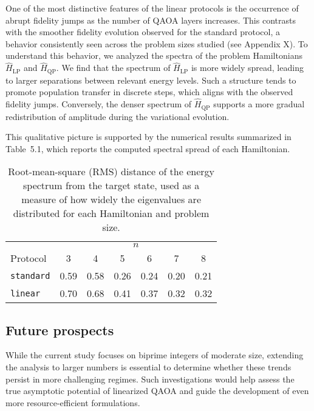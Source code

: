 One of the most distinctive features of the linear protocols is the occurrence of abrupt fidelity jumps as the number of QAOA layers increases.  
This contrasts with the smoother fidelity evolution observed for the standard protocol, a behavior consistently seen across the problem sizes studied (see Appendix X).  
To understand this behavior, we analyzed the spectra of the problem Hamiltonians $\hat{H}_\mathrm{LP}$ and $\hat{H}_\mathrm{QP}$.  
We find that the spectrum of $\hat{H}_\mathrm{LP}$ is more widely spread, leading to larger separations between relevant energy levels.
Such a structure tends to promote population transfer in discrete steps, which aligns with the observed fidelity jumps.
Conversely, the denser spectrum of $\hat{H}_\mathrm{QP}$ supports a more gradual redistribution of amplitude during the variational evolution.

This qualitative picture is supported by the numerical results summarized in
Table~5.1, which reports the computed spectral spread of each Hamiltonian.

\begin{table}[h]
    \centering
    \begin{tabular}{@{}lcccccc@{}}
        \toprule
        & \multicolumn{6}{c}{$n$} \\
        \cmidrule(lr){2-7}
        Protocol            & 3     & 4     & 5     & 6     & 7     & 8 \\
        \midrule
        \texttt{standard}   & 0.59  & 0.58  & 0.26  & 0.24  & 0.20  & 0.21 \\
        \texttt{linear}     & 0.70  & 0.68  & 0.41  & 0.37  & 0.32  & 0.32 \\
        \bottomrule
    \end{tabular}
    \caption{Root-mean-square (RMS) distance of the energy spectrum from the target state, used as a measure of how widely the eigenvalues are distributed for each Hamiltonian and problem size.}
    \label{asdf}
\end{table}

\subsection*{Future prospects}

While the current study focuses on biprime integers of moderate size, extending the analysis to larger numbers is essential to determine whether these trends persist in more challenging regimes.
Such investigations would help assess the true asymptotic potential of linearized QAOA and guide the development of even more resource-efficient formulations.

